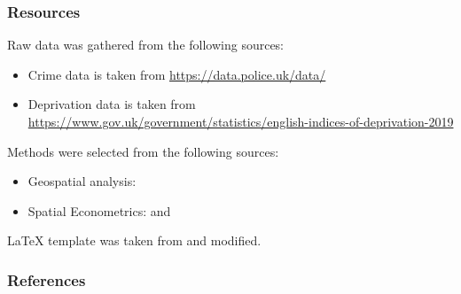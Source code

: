 \documentclass[10pt, aspectratio=169]{beamer}
\begin{document}
\begin{frame}[t]
    \frametitle{Resources}
    Raw data was gathered from the following sources:
    \begin{itemize}
        \item Crime data is taken from \url{https://data.police.uk/data/}
        \item Deprivation data is taken from \url{https://www.gov.uk/government/statistics/english-indices-of-deprivation-2019}
    \end{itemize}

    Methods were selected from the following sources:
    \begin{itemize}
        \item Geospatial analysis: \citet{lawhead2019learning}
        \item Spatial Econometrics: \citet{anselin1988spatial} and \citet{kopczewska2020applied}
    \end{itemize}

    LaTeX template was taken from \citet{GaudeckerEconProjectTemplates} and modified.

    \note{~}
\end{frame}

\begin{frame}[allowframebreaks]
    \frametitle{References}
    \renewcommand{\bibfont}{\normalfont\footnotesize}
    \printbibliography
\end{frame}
\end{document}
